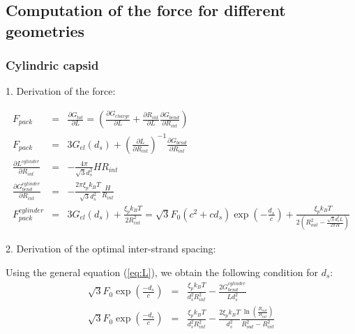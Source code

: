 \documentclass{article}
\begin{document}
\subsection*{Computation of the force for different geometries}


\subsubsection*{Cylindric capsid}

1. Derivation of the force:

\begin{eqnarray*}
    F_{pack} & = & \frac{\partial G_{tot}}{\partial L} = (\frac{\partial G_{charge}}{\partial L} + \frac{\partial R_{int}}{\partial L} \frac{\partial G_{bend}}{\partial R_{int}}) \\
    F_{pack} & = & 3 G_{el}(d_s) + \left( \frac{\partial L}{\partial R_{int}} \right)^{-1} \frac{\partial G_{bend}}{\partial R_{int}} \\
    \frac{\partial L^{cylinder}}{\partial R_{int}} & = & -\frac{4 \pi }{\sqrt{3}d_s^2} H R_{int} \\
    \frac{\partial G_{bend}^{cylinder}}{\partial R_{int}} & = & - \frac{2\pi \xi_p k_B T}{\sqrt{3}d_s^2} \frac{H}{R_{int}}  \\
F_{pack}^{cylinder} & = & 3 G_{el}(d_s) +  \frac{\xi_pk_B T}{2R_{int}^2} = \sqrt{3}F_0(c^2 + cd_s)\exp(-\frac{d_s}{c}) + \frac{\xi_pk_BT}{2(R_{out}^2 - \frac{\sqrt{3}d_s^2L}{2\pi H})}
\end{eqnarray*}

2. Derivation of the optimal inter-strand spacing:

Using the general equation (\ref{eq:L}), we obtain the following condition for $d_s$:
\begin{eqnarray*}
\sqrt{3}F_0 \exp{ \left( \frac{-d_s}{c} \right)} &=& \frac{\xi_p k_B T}{d_s^2 R_{int}^2 } - \frac{2 G_{bend}^{cylinder}}{Ld_s^2} \\
\sqrt{3}F_0 \exp{ \left( \frac{-d_s}{c} \right)} &=& \frac{\xi_p k_B T}{d_s^2 R_{int}^2 } - \frac{2\xi_p k_B T}{d_s^2}\frac{\ln(\frac{R_{out}}{R_{int}})}{R_{out}^2 - R_{int}^2}
\end{eqnarray*}
\end{document}
